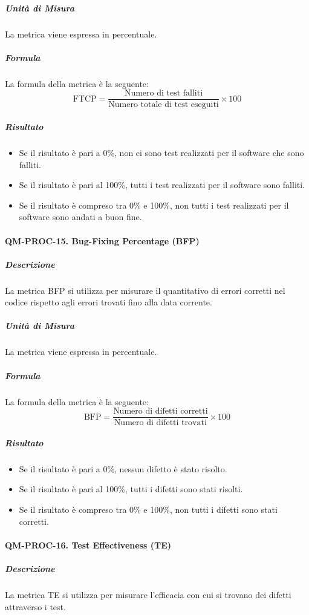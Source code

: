 			\subparagraph{Unità di Misura}
			La metrica viene espressa in percentuale.

			\subparagraph{Formula}
			La formula della metrica è la seguente:
			\[
				\text{FTCP} = \frac{\text{Numero di test falliti}}{\text{Numero totale di test eseguiti}} \times 100
			\]

			\subparagraph{Risultato}
			\begin{itemize}
				\item Se il risultato è pari a 0\%, non ci sono test realizzati per il software che sono falliti.
				\item Se il risultato è pari al 100\%, tutti i test realizzati per il software sono falliti.
				\item Se il risultato è compreso tra 0\% e 100\%, non tutti i test realizzati per il software sono andati a buon fine.
			\end{itemize}

		\paragraph{QM-PROC-15. Bug-Fixing Percentage (BFP)}

			\subparagraph{Descrizione}
			La metrica BFP si utilizza per misurare il quantitativo di errori corretti nel codice rispetto agli errori trovati fino alla data corrente.

			\subparagraph{Unità di Misura}
			La metrica viene espressa in percentuale.

			\subparagraph{Formula}
			La formula della metrica è la seguente:
			\[
				\text{BFP} = \frac{\text{Numero di difetti corretti}}{\text{Numero di difetti trovati}} \times 100
			\]

			\subparagraph{Risultato}
			\begin{itemize}
				\item Se il risultato è pari a 0\%, nessun difetto è stato risolto.
				\item Se il risultato è pari al 100\%, tutti i difetti sono stati risolti.
				\item Se il risultato è compreso tra 0\% e 100\%, non tutti i difetti sono stati corretti.
			\end{itemize}

		\paragraph{QM-PROC-16. Test Effectiveness (TE)}

			\subparagraph{Descrizione}
			La metrica TE si utilizza per misurare l'efficacia con cui si trovano dei difetti attraverso i test.

